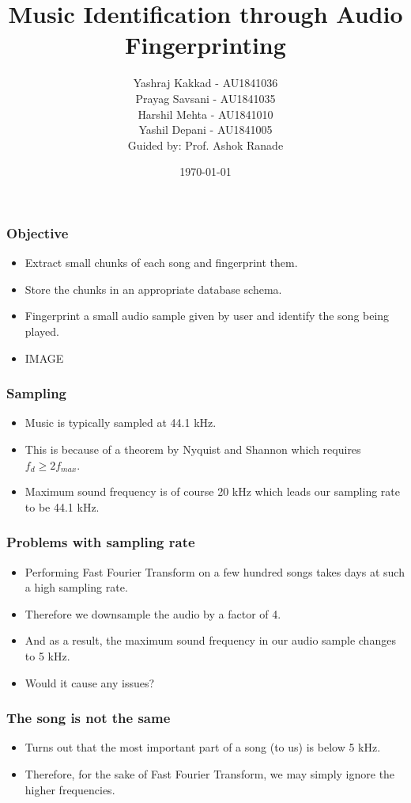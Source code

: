 \documentclass{beamer}
\author{Yashraj Kakkad - AU1841036 \\
        Prayag Savsani - AU1841035 \\
        Harshil Mehta - AU1841010 \\
        Yashil Depani - AU1841005 \\
        \vspace{8pt}Guided by: Prof. Ashok Ranade}
\title{Music Identification through Audio Fingerprinting}
\institute{Ahmedabad University}
\date{\today}
\begin{document}
\maketitle

\begin{frame}[t] %
\frametitle{Objective}
\begin{itemize}
    \item Extract small chunks of each song and fingerprint them.
    \item Store the chunks in an appropriate database schema. 
    \item Fingerprint a small audio sample given by user and identify the song being played.
    \item IMAGE
\end{itemize}
\end{frame}

\begin{frame}[t]
\frametitle{Sampling}
\begin{itemize}
    \item Music is typically sampled at \alert{44.1 kHz}.
    \item This is because of a theorem by \alert{Nyquist and Shannon} which requires \(f_{d} \ge 2f_{max}\).
    \item Maximum sound frequency is of course 20 kHz which leads our sampling rate to be 44.1 kHz.
\end{itemize}        
\end{frame}


\begin{frame}[t]
    \frametitle{Problems with sampling rate}
    \begin{itemize}
        \item Performing \alert{Fast Fourier Transform} on a few hundred songs takes days at such a high sampling rate.
        \item Therefore we downsample the audio by \alert{a factor of 4}. 
        \item And as a result, the maximum sound frequency in our audio sample changes to \alert{5 kHz}. 
        \item Would it cause any issues?
    \end{itemize}
\end{frame}

\begin{frame}[t]
    \frametitle{The song is not the same}   
    \begin{itemize}
        \item Turns out that the most important part of a song (to us) is below \alert{5 kHz}.
        \item Therefore, for the sake of Fast Fourier Transform, we may simply ignore the higher frequencies.
    \end{itemize}
\end{frame}
    
\end{document}
